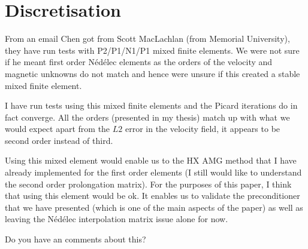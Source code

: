 \documentclass{article}
\newcommand{\nedelec}{N\'{e}d\'{e}lec }
\begin{document}
\section{Discretisation}

From an email Chen got from Scott MacLachlan (from Memorial University), they have run tests with P2/P1/N1/P1 mixed finite elements. We were not sure if he meant first order \nedelec elements as the orders of the velocity and magnetic unknowns do not match and hence were unsure if this created a stable mixed finite element.

I have run tests using this mixed finite elements and the Picard iterations do in fact converge. All the orders (presented in my thesis) match up with what we would expect apart from the $L2$ error in the velocity field, it appears to be second order instead of third.

Using this mixed element would enable us to the HX AMG method that I have already implemented for the first order elements (I still would like to understand the second order prolongation matrix). For the purposes of this paper, I think that using this element would be ok. It enables us to validate the preconditioner that we have presented (which is one of the main aspects of the paper) as well as leaving the \nedelec interpolation matrix issue alone for now.

Do you have an comments about this?





\end{document}
